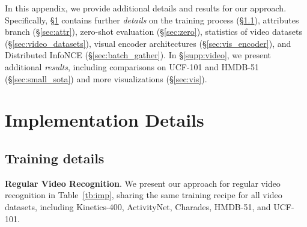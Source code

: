 \documentclass[10pt,twocolumn,letterpaper]{article}
\begin{document}
\clearpage
{}




\appendix
\setcounter{table}{0}
\setcounter{figure}{0}
\renewcommand{\thetable}{A.\arabic{table}}
\renewcommand{\thefigure}{A.\arabic{figure}}

In this appendix, we provide additional details and results for our approach.
Specifically, \S\ref{sec:imp_detail} contains further \textit{details} on the training process (\S\ref{sec:train_video}), attributes branch (\S\ref{sec:attr}), zero-shot evaluation (\S\ref{sec:zero}), statistics of video datasets (\S\ref{sec:video_datasets}), visual encoder architectures (\S\ref{sec:vis_encoder}), and Distributed InfoNCE (\S\ref{sec:batch_gather}). 
In \S\ref{supp:video}, we present additional \textit{results}, including comparisons on UCF-101 and HMDB-51 (\S\ref{sec:small_sota}) and more visualizations (\S\ref{sec:vis}).










\section{Implementation Details}\label{sec:imp_detail}
\subsection{Training details}\label{sec:train_video}
\noindent\textbf{Regular Video Recognition}. 
We present our approach for regular video recognition in Table~\ref{tb:imp}, sharing the same training recipe for all video datasets, including Kinetics-400, ActivityNet, Charades, HMDB-51, and UCF-101.
\end{document}
